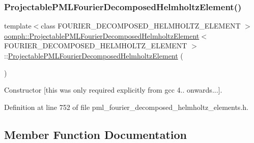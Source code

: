 \subsubsection{\texorpdfstring{Projectable\+P\+M\+L\+Fourier\+Decomposed\+Helmholtz\+Element()}{ProjectablePMLFourierDecomposedHelmholtzElement()}}
{\footnotesize\ttfamily template$<$class F\+O\+U\+R\+I\+E\+R\+\_\+\+D\+E\+C\+O\+M\+P\+O\+S\+E\+D\+\_\+\+H\+E\+L\+M\+H\+O\+L\+T\+Z\+\_\+\+E\+L\+E\+M\+E\+NT $>$ \\
\hyperlink{classoomph_1_1ProjectablePMLFourierDecomposedHelmholtzElement}{oomph\+::\+Projectable\+P\+M\+L\+Fourier\+Decomposed\+Helmholtz\+Element}$<$ F\+O\+U\+R\+I\+E\+R\+\_\+\+D\+E\+C\+O\+M\+P\+O\+S\+E\+D\+\_\+\+H\+E\+L\+M\+H\+O\+L\+T\+Z\+\_\+\+E\+L\+E\+M\+E\+NT $>$\+::\hyperlink{classoomph_1_1ProjectablePMLFourierDecomposedHelmholtzElement}{Projectable\+P\+M\+L\+Fourier\+Decomposed\+Helmholtz\+Element} (\begin{DoxyParamCaption}{ }\end{DoxyParamCaption})\hspace{0.3cm}{\ttfamily [inline]}}



Constructor \mbox{[}this was only required explicitly from gcc 4.. onwards...\mbox{]}. 



Definition at line 752 of file pml\+\_\+fourier\+\_\+decomposed\+\_\+helmholtz\+\_\+elements.\+h.



\subsection{Member Function Documentation}
\mbox{\label{classoomph_1_1ProjectablePMLFourierDecomposedHelmholtzElement_a49fec167b648f17be6517f241e0745e6}} 
